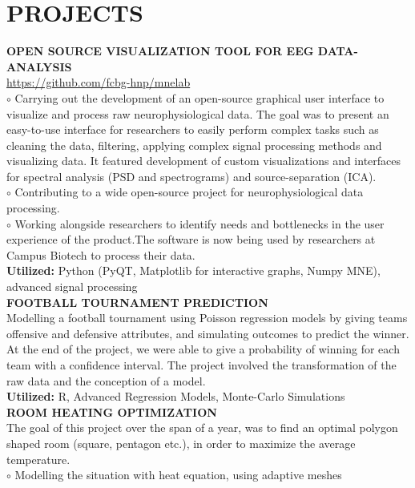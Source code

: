 \documentclass[]{cv-style}
\begin{document}
\section{PROJECTS}
\textbf{OPEN SOURCE VISUALIZATION TOOL FOR EEG DATA-ANALYSIS}\\
\url{https://github.com/fcbg-hnp/mnelab}\\
    $\circ$ Carrying out the development of an open-source graphical user 
    interface to visualize and process raw neurophysiological data. The goal
    was to present an easy-to-use interface for researchers to easily perform
    complex tasks such as cleaning the data, filtering, applying complex signal
    processing methods and visualizing data. It featured development of custom
    visualizations and interfaces for spectral analysis (PSD and spectrograms)
    and source-separation (ICA).\\
    $\circ$ Contributing to a wide open-source project for neurophysiological
    data processing.\\
    $\circ$ Working alongside researchers to identify needs and bottlenecks
    in the user experience of the product.The software is now being used by
    researchers at Campus Biotech to process their data.\\
\textbf{Utilized:} Python (PyQT, Matplotlib for interactive graphs, Numpy
MNE), advanced signal processing
\\[0.4cm]
\textbf{FOOTBALL TOURNAMENT PREDICTION}\\
    Modelling a football tournament using Poisson regression models by giving
    teams offensive and defensive attributes, and simulating outcomes to
    predict the winner. At the end of the project, we were able to give a
    probability of winning for each team with a confidence interval. The
    project involved the transformation of the raw data and the conception of
    a model.\\
\textbf{Utilized:} R, Advanced Regression Models, Monte-Carlo Simulations
\\[0.4cm]
\textbf{ROOM HEATING OPTIMIZATION}\\
    The goal of this project over the span of a year, was to find an optimal
    polygon shaped room (square, pentagon etc.), in order to maximize the
    average temperature.\\
    $\circ$ Modelling the situation with heat equation, using adaptive meshes\\
\end{document}

